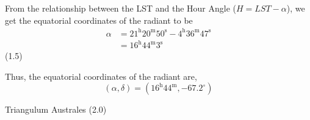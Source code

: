 \begin{description}
  From the relationship between the LST and the Hour Angle
  ($H = LST - \alpha$), we get the equatorial coordinates of the radiant to be
  \begin{align*}
    \alpha &= 21^{\mathrm{h}}20^{\mathrm{m}}50^{\mathrm{s}}
              - 4^{\mathrm{h}}36^{\mathrm{m}}47^{\mathrm{s}}\\
           &= 16^{\mathrm{h}}44^{\mathrm{m}}3^{\mathrm{s}}
  \end{align*}
  \hfill(1.5)

  Thus, the equatorial coordinates of the radiant are,
  \[
    (\alpha, \delta) = (16^{\mathrm{h}}44^{\mathrm{m}}, -67.2^\circ)
  \]

\item[(d)] Triangulum Australes \hfill(2.0)
\end{description}

